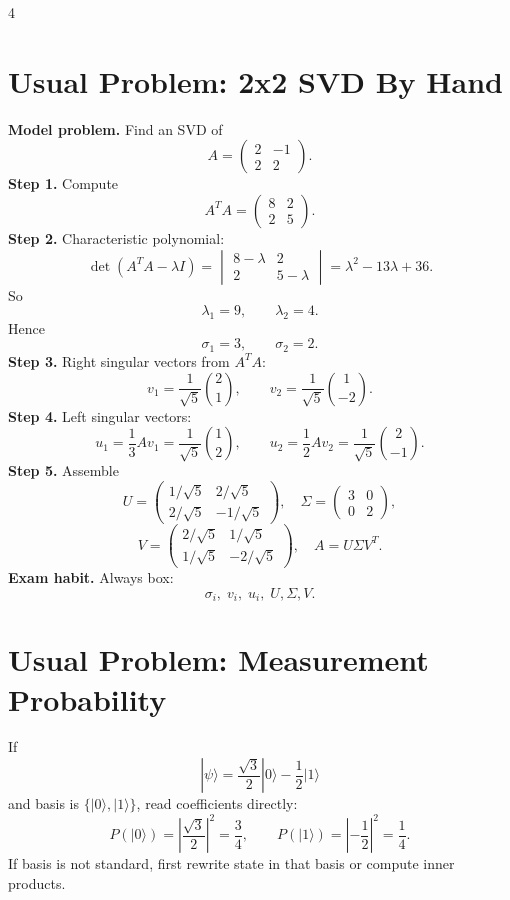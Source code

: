 \documentclass[letterpaper]{article}
\newcommand{\ket}[1]{|#1\rangle}
\newcommand{\smallhead}[1]{{\bfseries #1}}
\begin{document}
\begin{multicols*}{4}
\section{Usual Problem: 2x2 SVD By Hand}
\smallhead{Model problem.} Find an SVD of
\[
A=\begin{pmatrix}2&-1\\2&2\end{pmatrix}.
\]
\smallhead{Step 1.} Compute
\[
A^TA=\begin{pmatrix}8&2\\2&5\end{pmatrix}.
\]
\smallhead{Step 2.} Characteristic polynomial:
\[
\det(A^TA-\lambda I)
=
\begin{vmatrix}8-\lambda&2\\2&5-\lambda\end{vmatrix}
=\lambda^2-13\lambda+36.
\]
So
\[
\lambda_1=9,\qquad \lambda_2=4.
\]
Hence
\[
\sigma_1=3,\qquad \sigma_2=2.
\]
\smallhead{Step 3.} Right singular vectors from $A^TA$:
\[
v_1=\frac{1}{\sqrt5}\binom21,\qquad
v_2=\frac{1}{\sqrt5}\binom{1}{-2}.
\]
\smallhead{Step 4.} Left singular vectors:
\[
u_1=\frac{1}{3}Av_1=\frac{1}{\sqrt5}\binom12,\qquad
u_2=\frac{1}{2}Av_2=\frac{1}{\sqrt5}\binom{2}{-1}.
\]
\smallhead{Step 5.} Assemble
\[
U=\begin{pmatrix}
1/\sqrt5&2/\sqrt5\\
2/\sqrt5&-1/\sqrt5
\end{pmatrix},
\quad
\Sigma=\begin{pmatrix}3&0\\0&2\end{pmatrix},
\]
\[
V=\begin{pmatrix}
2/\sqrt5&1/\sqrt5\\
1/\sqrt5&-2/\sqrt5
\end{pmatrix},
\quad
A=U\Sigma V^T.
\]
\smallhead{Exam habit.} Always box:
\[
\sigma_i,\; v_i,\; u_i,\; U,\Sigma,V.
\]

\section{Usual Problem: Measurement Probability}
If
\[
\ket{\psi}=\frac{\sqrt3}{2}\ket0-\frac12\ket1
\]
and basis is $\{\ket0,\ket1\}$, read coefficients directly:
\[
P(\ket0)=\left|\frac{\sqrt3}{2}\right|^2=\frac34,
\qquad
P(\ket1)=\left|-\frac12\right|^2=\frac14.
\]
If basis is not standard, first rewrite state in that basis or compute inner products.


\end{multicols*}
\end{document}
